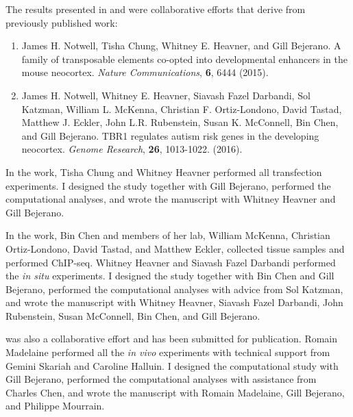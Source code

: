 The results presented in  and  were collaborative efforts that derive from previously published work:

\begin{enumerate}
\item James H. Notwell, Tisha Chung, Whitney E. Heavner, and Gill Bejerano. A family of transposable elements co-opted into developmental enhancers in the mouse neocortex. \emph{Nature Communications}, \textbf{6}, 6444 (2015).

\item James H. Notwell, Whitney E. Heavner, Siavash Fazel Darbandi, Sol Katzman, William L. McKenna, Christian F. Ortiz-Londono, David Tastad, Matthew J. Eckler, John L.R. Rubenstein, Susan K. McConnell, Bin Chen, and Gill Bejerano. TBR1 regulates autism risk genes in the developing neocortex. \emph{Genome Research}, \textbf{26}, 1013-1022. (2016).
\end{enumerate}

In the  work, Tisha Chung and Whitney Heavner performed all transfection experiments. I designed the study together with Gill Bejerano, performed the computational analyses, and wrote the manuscript with Whitney Heavner and Gill Bejerano.

In the  work, Bin Chen and members of her lab, William McKenna, Christian Ortiz-Londono, David Tastad, and Matthew Eckler, collected tissue samples and performed ChIP-seq. Whitney Heavner and Siavash Fazel Darbandi performed the \emph{in situ} experiments. I designed the study together with Bin Chen and Gill Bejerano, performed the computational analyses with advice from Sol Katzman, and wrote the manuscript with Whitney Heavner, Siavash Fazel Darbandi, John Rubenstein, Susan McConnell, Bin Chen, and Gill Bejerano.

 was also a collaborative effort and has been submitted for publication. Romain Madelaine performed all the \emph{in vivo} experiments with technical support from Gemini Skariah and Caroline Halluin. I designed the computational study with Gill Bejerano, performed the computational analyses with assistance from Charles Chen, and wrote the manuscript with Romain Madelaine, Gill Bejerano, and Philippe Mourrain.

